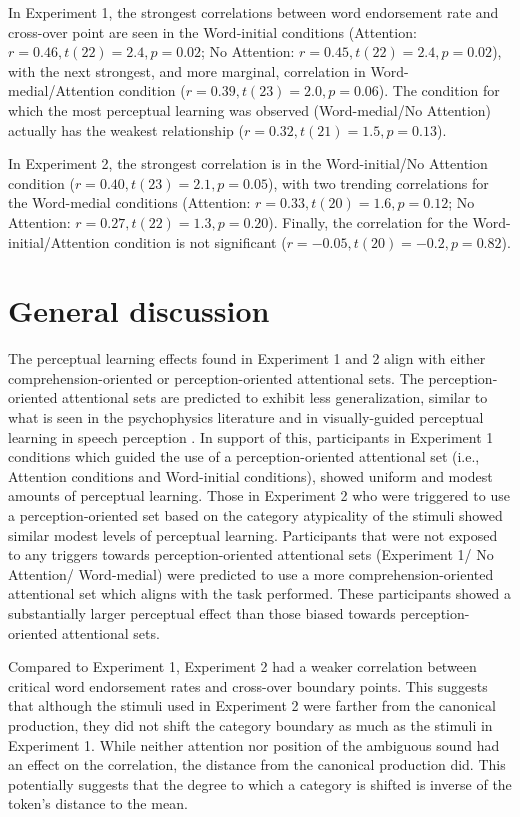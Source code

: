 In Experiment 1, the strongest correlations between word endorsement rate and cross-over point are seen in the Word-initial conditions (Attention: $r = 0.46, t(22) = 2.4, p = 0.02$; No Attention: $r = 0.45, t(22) = 2.4, p = 0.02$), with the next strongest, and more marginal, correlation in Word-medial/Attention condition ($r = 0.39, t(23) = 2.0, p = 0.06$).  The condition for which the most perceptual learning was observed (Word-medial/No Attention) actually has the weakest relationship ($r = 0.32, t(21) = 1.5, p = 0.13$).

In Experiment 2, the strongest correlation is in the Word-initial/No Attention condition ($r = 0.40, t(23) = 2.1, p = 0.05$), with two trending correlations for the Word-medial conditions (Attention: $r = 0.33, t(20) = 1.6, p = 0.12$; No Attention: $r = 0.27, t(22) = 1.3, p = 0.20$).  Finally, the correlation for the Word-initial/Attention condition is not significant ($r = -0.05, t(20) = -0.2, p = 0.82$).

\section{General discussion}


The perceptual learning effects found in Experiment 1 and 2 align with either comprehension-oriented or perception-oriented attentional sets.  
The perception-oriented attentional sets are predicted to exhibit less generalization, similar to what is seen in the psychophysics literature and  in visually-guided perceptual learning in speech perception \citep{Reinisch2014}.
In support of this, participants in Experiment 1 conditions which guided the use of a perception-oriented attentional set (i.e., Attention conditions and Word-initial conditions), showed uniform and modest amounts of perceptual learning.
Those in Experiment 2 who were triggered to use a perception-oriented set based on the category atypicality of the stimuli showed similar modest levels of perceptual learning.
Participants that were not exposed to any triggers towards perception-oriented attentional sets (Experiment 1/ No Attention/ Word-medial) were predicted to use a more comprehension-oriented attentional set which aligns with the task performed.
These participants showed a substantially larger perceptual effect than those biased towards perception-oriented attentional sets.

Compared to Experiment 1, Experiment 2 had a weaker correlation between critical word endorsement rates and cross-over boundary points.
This suggests that although the stimuli used in Experiment 2 were farther from the canonical production, they did not shift the category boundary as much as the stimuli in Experiment 1.  
While neither attention nor position of the ambiguous sound had an effect on the correlation, the distance from the canonical production did.  
This potentially suggests that the degree to which a category is shifted is inverse of the token's distance to the mean.

